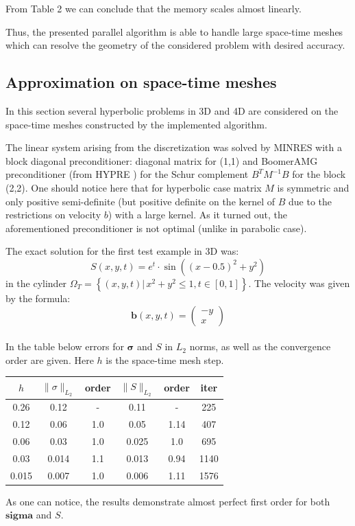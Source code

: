 \documentclass[12pt]{article}
\begin{document}
From Table 2 we can conclude that the memory scales almost linearly. 

Thus, the presented parallel algorithm is able to handle large space-time meshes which can resolve the geometry of the considered problem with desired accuracy.

\subsection{Approximation on space-time meshes}

In this section several hyperbolic problems in 3D and 4D are considered on the space-time meshes constructed by the implemented algorithm.

The linear system arising from the discretization was solved by MINRES with a block diagonal preconditioner: diagonal matrix for (1,1) and BoomerAMG preconditioner (from HYPRE \cite{hypre}) for the Schur complement $B^T M^{-1} B$ for the block (2,2). One should notice here that for hyperbolic case matrix $M$ is symmetric and only positive semi-definite (but positive definite on the kernel of $B$ due to the restrictions on velocity $b$) with a large kernel. As it turned out, the aforementioned preconditioner is not optimal (unlike in parabolic case). 

The exact solution for the first test example in 3D was:
$$
S(x,y,t) = e^t \cdot \operatorname{sin} \left(
(x - 0.5)^2 + y^2 \right)$$
in the cylinder $\Omega_T = \left\{ (x,y,t) | \, x^2+y^2 \leq 1, t \in [0,1]  \right\}$.
The velocity was given by the formula:
$$
\mathbf{b}(x,y,t) = \left(
 \begin{array}{c}
 - y \\
 x
 \end{array}
  \right)
  $$ \\
In the table below errors for $\mathbf{\sigma}$ and $S$ in $L_2$ norms, as well as the convergence order are given. Here $h$ is the space-time mesh step.
\begin{center}
\begin{tabular}{|c|c|c|c|c|c|}
\hline
$h$ & $\parallel \sigma \parallel_{L_2}$ & order & $\parallel S \parallel_{L_2}$ & order  & iter \\
\hline
0.26  & 0.12  & -    	& 0.11  & -		& 225 \\ %
\hline
0.12  & 0.06  & 1.0     & 0.05  & 1.14	& 407 \\ %
\hline
0.06  & 0.03  & 1.0     & 0.025 & 1.0   & 695 \\ %
\hline
0.03  & 0.014 & 1.1     & 0.013 & 0.94  & 1140 \\ %
\hline
0.015 & 0.007 & 1.0     & 0.006 & 1.11  & 1576 \\ %
\hline
\end{tabular}
\end{center}
As one can notice, the results demonstrate almost perfect first order for both $\mathbf{sigma}$ and $S$.
\end{document}
